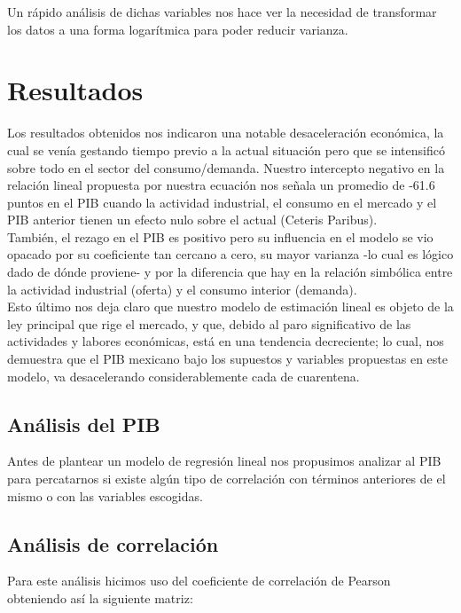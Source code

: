 \documentclass[a4paper]{article}
\begin{document}
Un rápido análisis de dichas variables nos hace ver la necesidad de transformar los datos a una forma logarítmica para poder reducir varianza.


\section{Resultados}

Los resultados obtenidos nos indicaron una notable desaceleración económica, la cual se venía gestando tiempo previo a la actual situación pero que se intensificó sobre todo en el sector del consumo/demanda. Nuestro intercepto negativo en la relación lineal propuesta por nuestra ecuación nos señala un promedio de -61.6 puntos en el PIB cuando la actividad industrial, el consumo en el mercado y el PIB anterior tienen un efecto nulo sobre el actual (Ceteris Paribus). \\

También, el rezago en el PIB es positivo pero su influencia en el modelo se vio opacado por su coeficiente tan cercano a cero, su mayor varianza -lo cual es lógico dado de dónde proviene- y por la diferencia que hay en la relación simbólica entre la actividad industrial (oferta) y el consumo interior (demanda).\\

Esto último nos deja claro que nuestro modelo de estimación lineal es objeto de la ley principal que rige el mercado, y que, debido al paro significativo de las actividades y labores económicas, está en una tendencia decreciente; lo cual, nos demuestra que el PIB mexicano bajo los supuestos y variables propuestas en este modelo, va desacelerando considerablemente cada de cuarentena.\\

\subsection{Análisis del PIB}

Antes de plantear un modelo de regresión lineal nos propusimos analizar al PIB para percatarnos si existe algún tipo de correlación con términos anteriores de el mismo o con las variables escogidas.

\subsection{Análisis de correlación}

Para este análisis hicimos uso del coeficiente de correlación de Pearson obteniendo así la siguiente matriz:
\end{document}
